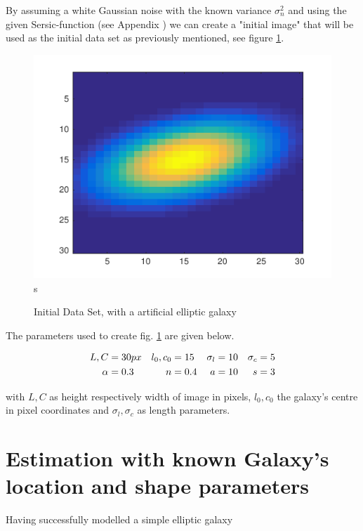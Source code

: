 By assuming a white Gaussian noise with the known variance $\sigma_n^2$ and using the given Sersic-function (see Appendix ) we can create a "initial image" that will be used as the initial data set as previously mentioned, see figure \ref{img:initial}.
\begin{figure}[!h]
	\centering
	\includegraphics{images/galaxy_initial}s
	\label{img:initial}
	\caption{Initial Data Set, with a artificial elliptic galaxy}
\end{figure}

The parameters used to create fig. \ref{img:initial} are given below.

\begin{equation}
	\centering
	\begin{align*}
		L, C & = 30px & l_0, c_0 & = 15 & \sigma_l & = 10 & \sigma_c & = 5 \\
		\alpha & = 0.3 & n & = 0.4 & a & = 10 & s & = 3 
	\end{align*}
\end{equation}

with $L,C$ as height respectively width of image in pixels, $l_0, c_0$ the galaxy's centre in pixel coordinates and $\sigma_l, \sigma_c$ as length parameters.


\section{Estimation with known Galaxy's location and shape parameters}
Having successfully modelled a simple elliptic galaxy



